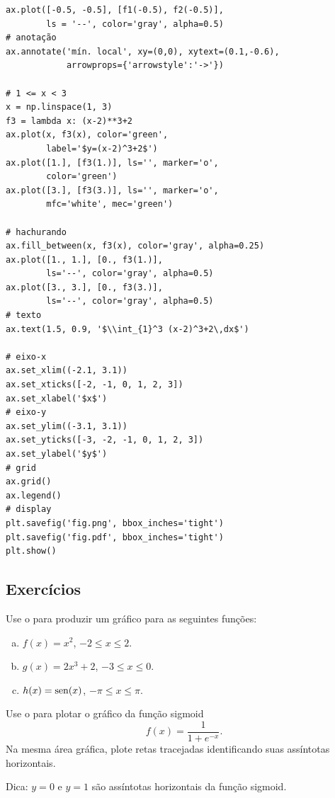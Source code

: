 \begin{ex}
\begin{lstlisting}
ax.plot([-0.5, -0.5], [f1(-0.5), f2(-0.5)],
        ls = '--', color='gray', alpha=0.5)
# anotação
ax.annotate('mín. local', xy=(0,0), xytext=(0.1,-0.6),
            arrowprops={'arrowstyle':'->'})

# 1 <= x < 3
x = np.linspace(1, 3)
f3 = lambda x: (x-2)**3+2
ax.plot(x, f3(x), color='green',
        label='$y=(x-2)^3+2$')
ax.plot([1.], [f3(1.)], ls='', marker='o',
        color='green')
ax.plot([3.], [f3(3.)], ls='', marker='o',
        mfc='white', mec='green')

# hachurando
ax.fill_between(x, f3(x), color='gray', alpha=0.25)
ax.plot([1., 1.], [0., f3(1.)],
        ls='--', color='gray', alpha=0.5)
ax.plot([3., 3.], [0., f3(3.)],
        ls='--', color='gray', alpha=0.5)
# texto
ax.text(1.5, 0.9, '$\\int_{1}^3 (x-2)^3+2\,dx$')

# eixo-x
ax.set_xlim((-2.1, 3.1))
ax.set_xticks([-2, -1, 0, 1, 2, 3])
ax.set_xlabel('$x$')
# eixo-y
ax.set_ylim((-3.1, 3.1))
ax.set_yticks([-3, -2, -1, 0, 1, 2, 3])
ax.set_ylabel('$y$')
# grid
ax.grid()
ax.legend()
# display
plt.savefig('fig.png', bbox_inches='tight')
plt.savefig('fig.pdf', bbox_inches='tight')
plt.show()
\end{lstlisting}

\end{ex}

\subsection{Exercícios}

\begin{exer}
  Use o {\matplotlib} para produzir um gráfico para as seguintes funções:
  \begin{enumerate}[a)]
  \item $\displaystyle f(x) = x^2$, $-2 \leq x \leq 2$.
  \item $\displaystyle g(x) = 2x^3+2$, $-3 \leq x \leq 0$.
  \item $\displaystyle h(x) = \operatorname{sen}(x)$, $-\pi \leq x \leq \pi$.
  \end{enumerate}
\end{exer}

\begin{exer}
  Use o {\matplotlib} para plotar o gráfico da função sigmoid
  \begin{equation}
    f(x) = \frac{1}{1 + e^{-x}}.
  \end{equation}
  Na mesma área gráfica, plote retas tracejadas identificando suas assíntotas horizontais.
\end{exer}
\begin{resp}
  Dica: $y = 0$ e $y=1$ são assíntotas horizontais da função sigmoid.
\end{resp}


